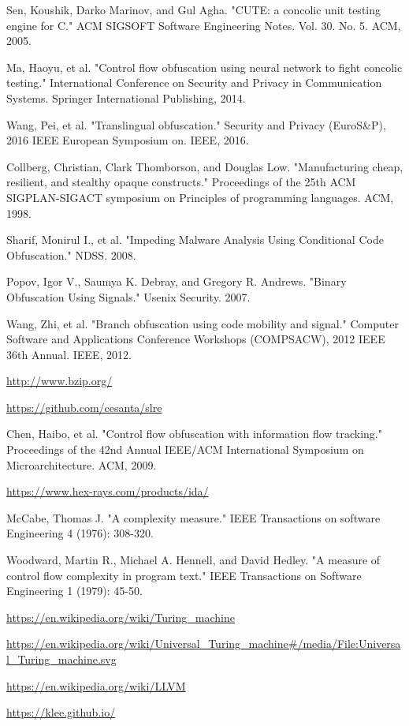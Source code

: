 \documentclass[lnicst]{svmultln}
\begin{document}
%
%
\begin{thebibliography}{5}

 Sen, Koushik, Darko Marinov, and Gul Agha. "CUTE: a concolic unit testing engine for C." ACM SIGSOFT Software Engineering Notes. Vol. 30. No. 5. ACM, 2005.

 Ma, Haoyu, et al. "Control flow obfuscation using neural network to fight concolic testing." International Conference on Security and Privacy in Communication Systems. Springer International Publishing, 2014.

 Wang, Pei, et al. "Translingual obfuscation." Security and Privacy (EuroS\&P), 2016 IEEE European Symposium on. IEEE, 2016.

 Collberg, Christian, Clark Thomborson, and Douglas Low. "Manufacturing cheap, resilient, and stealthy opaque constructs." Proceedings of the 25th ACM SIGPLAN-SIGACT symposium on Principles of programming languages. ACM, 1998.

 Sharif, Monirul I., et al. "Impeding Malware Analysis Using Conditional Code Obfuscation." NDSS. 2008.

 Popov, Igor V., Saumya K. Debray, and Gregory R. Andrews. "Binary Obfuscation Using Signals." Usenix Security. 2007.

 Wang, Zhi, et al. "Branch obfuscation using code mobility and signal." Computer Software and Applications Conference Workshops (COMPSACW), 2012 IEEE 36th Annual. IEEE, 2012.

 \url{http://www.bzip.org/}

 \url{https://github.com/cesanta/slre}

 Chen, Haibo, et al. "Control flow obfuscation with information flow tracking." Proceedings of the 42nd Annual IEEE/ACM International Symposium on Microarchitecture. ACM, 2009.

 \url{https://www.hex-rays.com/products/ida/}

 McCabe, Thomas J. "A complexity measure." IEEE Transactions on software Engineering 4 (1976): 308-320.

 Woodward, Martin R., Michael A. Hennell, and David Hedley. "A measure of control flow complexity in program text." IEEE Transactions on Software Engineering 1 (1979): 45-50.

 \url{https://en.wikipedia.org/wiki/Turing_machine}

 \url{https://en.wikipedia.org/wiki/Universal_Turing_machine#/media/File:Universal_Turing_machine.svg}

 \url{https://en.wikipedia.org/wiki/LLVM}

 \url{https://klee.github.io/}


\end{thebibliography}
%
\end{document}
